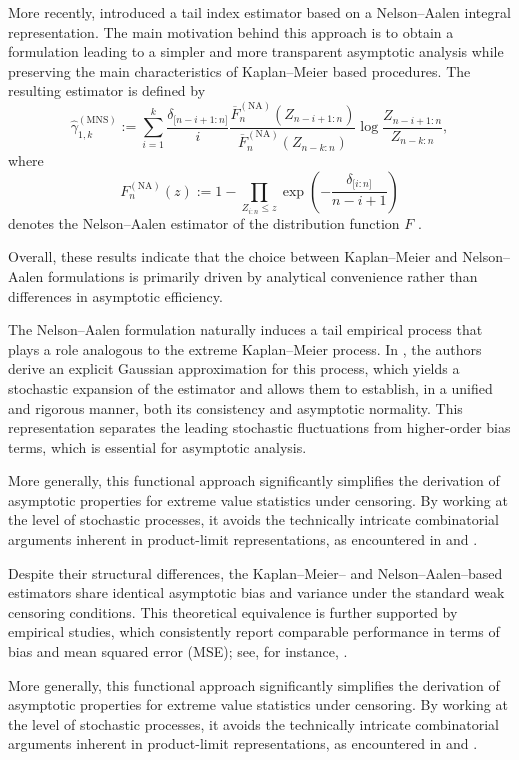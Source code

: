 \documentclass[reqno,openbib,runningheads,a4paper,12pt]{amsart}%
\begin{document}
\noindent More recently, \cite{MNS2025} introduced a tail index estimator
based on a Nelson--Aalen integral representation. The main motivation behind
this approach is to obtain a formulation leading to a simpler and more
transparent asymptotic analysis while preserving the main characteristics of
Kaplan--Meier based procedures. The resulting estimator is defined by
\[
\widehat{\gamma}_{1,k}^{(\mathrm{MNS})}:=\sum_{i=1}^{k}\frac{\delta_{\lbrack
n-i+1:n]}}{i}\frac{\overline{F}_{n}^{(\mathrm{NA})}(Z_{n-i+1:n})}{\overline
{F}_{n}^{(\mathrm{NA})}(Z_{n-k:n})}\log\frac{Z_{n-i+1:n}}{Z_{n-k:n}},
\]
where
\[
F_{n}^{(\mathrm{NA})}(z):=1-\prod_{Z_{i:n}\leq z}\exp\!\left(  -\frac
{\delta_{\lbrack i:n]}}{n-i+1}\right)
\]
denotes the Nelson--Aalen estimator of the distribution function $F$
\citep{Nelson1972}.\smallskip

\noindent Overall, these results indicate that the choice between
Kaplan--Meier and Nelson--Aalen formulations is primarily driven by analytical
convenience rather than differences in asymptotic efficiency.\smallskip

\noindent The Nelson--Aalen formulation naturally induces a tail empirical
process that plays a role analogous to the extreme Kaplan--Meier process. In
\cite{MNS2025}, the authors derive an explicit Gaussian approximation for this
process, which yields a stochastic expansion of the estimator and allows them
to establish, in a unified and rigorous manner, both its consistency and
asymptotic normality. This representation separates the leading stochastic
fluctuations from higher-order bias terms, which is essential for asymptotic
analysis.\smallskip

\noindent More generally, this functional approach significantly simplifies
the derivation of asymptotic properties for extreme value statistics under
censoring. By working at the level of stochastic processes, it avoids the
technically intricate combinatorial arguments inherent in product-limit
representations, as encountered in \cite{WW2014} and \cite{BWW2019}.\smallskip

\noindent Despite their structural differences, the Kaplan--Meier-- and
Nelson--Aalen--based estimators share identical asymptotic bias and variance
under the standard weak censoring conditions. This theoretical equivalence is
further supported by empirical studies, which consistently report comparable
performance in terms of bias and mean squared error (MSE); see, for instance,
\cite{Colosimo2002}.\smallskip

\noindent More generally, this functional approach significantly simplifies
the derivation of asymptotic properties for extreme value statistics under
censoring. By working at the level of stochastic processes, it avoids the
technically intricate combinatorial arguments inherent in product-limit
representations, as encountered in \cite{WW2014} and \cite{BWW2019}.\smallskip
\end{document}

